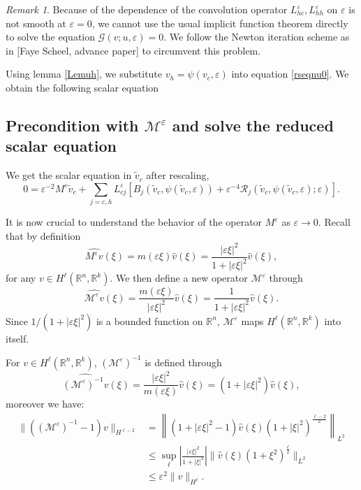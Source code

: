 \documentclass[letterpaper,11pt]{article}
\newcommand{\R}{\mathbb{R}}
\newcommand{\eps}{\varepsilon}
\newcommand{\Rm}{\mathcal{R}}
\newcommand{\G}{\mathcal{G}}
\newcommand{\M}{\mathcal{M}}
\numberwithin{equation}{section}
\theoremstyle{plain}
\theoremstyle{remark}
\newtheorem*{remark}{Remark}
\begin{document}
\begin{remark} Because of the dependence of the convolution operator $L_{hc}^\eps, L_{hh}^\eps$ on $\eps$ is not smooth at $\eps = 0$, we cannot use the usual implicit function theorem directly to solve the equation $\G(v;u,\eps) = 0$. We follow the Newton iteration scheme as in [Faye Scheel, advance paper] to circumvent this problem.
\end{remark}

Using lemma \ref{Lemuh}, we substitute $v_h = \psi(v_c,\eps)$ into equation \eqref{rseqnu0}. We obtain the following scalar equation



\subsection{Precondition with \texorpdfstring{$\M^\eps $}{Lg} and solve the reduced scalar equation} 
We get the scalar equation in $\tilde{v}_c$ after rescaling,
\begin{equation} \label{1dnl}
0 = \eps^{-2}M^\eps \tilde{v}_c + \sum_{j=c,h}L_{cj}^\eps\left[B_j(\tilde{v}_c,\psi(\tilde{v}_c,\eps))+\eps^{-4}\Rm_j(\tilde{v}_c,\psi(\tilde{v}_c,\eps);\eps)\right].
\end{equation}


It is now crucial to understand the behavior of the operator $M^\eps$ as $\eps \to 0$. Recall that by definition
\[
\widehat{M^\eps v}(\xi) = m(\eps \xi)\widehat{v}(\xi) = \frac{|\eps\xi|^2}{1+|\eps\xi|^2} \widehat{v}(\xi), 
\]
for any $v\in H^\ell(\R^n,\R^k)$. We then define a new operator $\mathcal{M}^\eps$ through 
\[ 
\widehat{\mathcal{M}^\eps v}(\xi) = \frac{m(\eps\xi)}{|\eps\xi|^2}\widehat{v}(\xi)=\frac{1}{1+|\eps\xi|^2} \widehat{v}(\xi). 
\] 
Since $1/(1+|\eps \xi|^2)$ is a bounded function on $\R^n$, $\M^\eps$ maps $H^\ell(\R^n,\R^k)$ into itself. 

For $v\in H^\ell(\R^n,\R^k)$, $(\M^{\eps})^{-1}$ is defined through
\[
\widehat{(\M^{\eps})^{-1}v} (\xi) = \frac{|\eps\xi|^2}{m(\eps\xi)} \widehat{v}(\xi)= (1+|\eps \xi|^2)\widehat{v}(\xi),
\]
moreover we have:
\begin{align*}
\|((\M^\eps)^{-1}-1)v\|_{H^{\ell-2}} &=\left\| \left(1+|\eps\xi|^2-1\right)\widehat{v}(\xi)(1+|\xi|^2)^{\frac{\ell-2}{2}}\right\|_{L^2} 
\\
& \le \sup_{\ell} \left|\frac{|\eps\xi|^2}{1+|\xi|^2}\right| \|\widehat{v}(\xi)(1+\xi^2)^{\frac{\ell}{2}} \|_{L^{2}}\\ 
&\le \eps^2 \|v\|_{H^\ell}.
\end{align*}
\end{document}
